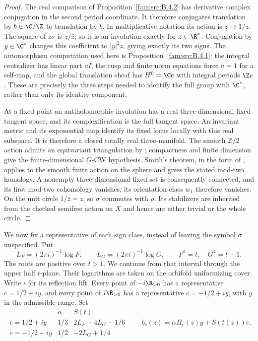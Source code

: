 \begin{proof}
The real comparison of Proposition~\ref{fam:src:B.4.2} has derivative complex conjugation in the
second period coordinate. It therefore conjugates translation by
$b\in\C/\Z$ to translation by $\bar b$. In multiplicative notation its
action is $z\mapsto1/\bar z$. The square of $z\sigma$ is $z/\bar z$,
so it is an involution exactly for $z\in\R^*$. Conjugation by $y\in\C^*$
changes this coefficient to $|y|^2z$, giving exactly its two signs.
The automorphism computation used here is Proposition~\ref{fam:src:B.4.1}: the integral centralizer has linear part $aI$, the cusp and
finite norm equations force $a=1$ for a self-map, and the global
translation sheaf has $H^0=\C e$ with integral periods $\Z e$.
These are precisely the three steps needed to identify the full group
with $\C^*$, rather than only its identity component.

At a fixed point an antiholomorphic involution has a real three-dimensional
fixed tangent space, and its complexification is the full tangent space.
An invariant metric and its exponential map identify its fixed locus
locally with this real subspace. It is therefore a closed totally real
three-manifold. The smooth $\mathbb Z/2$ action admits an equivariant
triangulation by \cite[Theorem~3.1, p.~48]{Illman1972}; compactness and finite
dimension give the finite-dimensional $G$-CW hypothesis. Smith's theorem,
in the form of
\cite[Theorem 4.1(1)]{Knudson2004}, applies to the smooth finite action on
the sphere and gives the stated mod-two homology. A nonempty
three-dimensional fixed set is consequently connected, and its first
mod-two cohomology vanishes; its orientation class $w_1$ therefore
vanishes. On the unit circle $1/\bar z=z$, so $\sigma$ commutes with
$\rho$. Its stabilizers are inherited from the checked semifree action
on $X$ and hence are either trivial or the whole circle.
\end{proof}

We now fix a representative of each sign class, instead of leaving the
symbol $\sigma$ unspecified. Put
\[
 L_F=(2\pi i)^{-1}\log F,\qquad L_G=(2\pi i)^{-1}\log G,
 \qquad F^3=t,\quad G^4=t-1.
 \label{mapsI:real-eq-1}
\]
The roots are positive over $t>1$. We continue from that interval
through the upper half $t$-plane. Their logarithms are taken on the
orbifold uniformizing cover. Write $\iota$ for its reflection lift.
Every point of $-i\R_{>0}$ has a representative $c=1/2+iy$, and every
point of $i\R_{>0}$ has a representative $c=-1/2+iy$, with $y$ in the
admissible range. Set
\[
\begin{array}{c|c|c}
 &\alpha&S(t)\\\hline
 c=1/2+iy&1/3&2L_F-4L_G-1/6\\
 c=-1/2+iy&1/2&-2L_G+1/4
\end{array}
\qquad b_c(z)=\alpha\Pi_c(z)g+S(t(z))e.
\label{mapsI:real-eq-2}
\]

